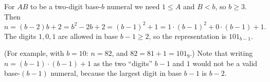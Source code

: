 For $AB$ to be a two-digit base-$b$ numeral we need $1\le A$ and $B<b$, so $b\ge3$. Then
\[n=(b-2)b+2=b^2-2b+2=(b-1)^2+1=1\cdot(b-1)^2+0\cdot(b-1)+1.\]
The digits $1,0,1$ are allowed in base $b-1\ge2$, so the representation is $\boxed{101_{b-1}}$.

(For example, with $b=10$: $n=82$, and $82=81+1=101_9$.) Note that writing $n=(b-1)\cdot(b-1)+1$ as the two ``digits'' $b-1$ and $1$ would not be a valid base-$(b-1)$ numeral, because the largest digit in base $b-1$ is $b-2$.
